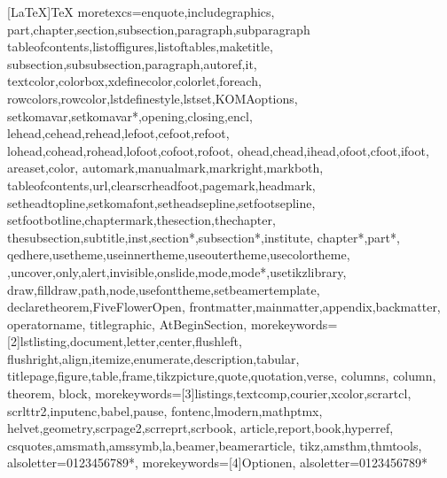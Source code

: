 [LaTeX]{TeX}%
{moretexcs={enquote,includegraphics,%
part,chapter,section,subsection,paragraph,subparagraph%
tableofcontents,listoffigures,listoftables,maketitle,%
subsection,subsubsection,paragraph,autoref,it,%
textcolor,colorbox,xdefinecolor,colorlet,foreach,%
rowcolors,rowcolor,lstdefinestyle,lstset,KOMAoptions,%
setkomavar,setkomavar*,opening,closing,encl,%
lehead,cehead,rehead,lefoot,cefoot,refoot,%
lohead,cohead,rohead,lofoot,cofoot,rofoot,%
ohead,chead,ihead,ofoot,cfoot,ifoot,%
areaset,color,%
automark,manualmark,markright,markboth,%
tableofcontents,url,clearscrheadfoot,pagemark,headmark,%
setheadtopline,setkomafont,setheadsepline,setfootsepline,%
setfootbotline,chaptermark,thesection,thechapter,%
thesubsection,subtitle,inst,section*,subsection*,institute,%
chapter*,part*,%
qedhere,usetheme,useinnertheme,useoutertheme,usecolortheme,%
,uncover,only,alert,invisible,onslide,mode,mode*,usetikzlibrary,%
draw,filldraw,path,node,usefonttheme,setbeamertemplate,%
declaretheorem,FiveFlowerOpen,%
frontmatter,mainmatter,appendix,backmatter,%
operatorname, titlegraphic, AtBeginSection},%
morekeywords={[2]lstlisting,document,letter,center,flushleft,%
flushright,align,itemize,enumerate,description,tabular,%
titlepage,figure,table,frame,tikzpicture,quote,quotation,verse, 
columns, column, theorem, block},%
morekeywords={[3]listings,textcomp,courier,xcolor,scrartcl,%
scrlttr2,inputenc,babel,pause,%
fontenc,lmodern,mathptmx,%
helvet,geometry,scrpage2,scrreprt,scrbook,%
article,report,book,hyperref,%
csquotes,amsmath,amssymb,la,beamer,beamerarticle,%
tikz,amsthm,thmtools},
alsoletter={0123456789*},
morekeywords={[4]Optionen},
alsoletter={0123456789*}
}%



